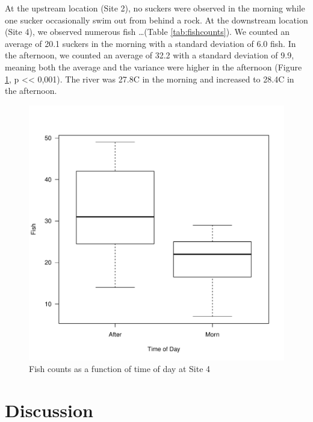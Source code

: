 \documentclass{article}\usepackage[]{graphicx}\usepackage[]{color}
\makeatletter
\def\maxwidth{ %
  \ifdim\Gin@nat@width>\linewidth
    \linewidth
  \else
    \Gin@nat@width
  \fi
}
\newenvironment{knitrout}{}{} %
\makeatother
\begin{document}
At the upstream location (Site 2), no suckers were observed in the morning while one sucker occasionally swim out from behind a rock. At the downstream location (Site 4), we observed numerous fish \ldots (Table \ref{tab:fishcounts}). We counted an average of 20.1 suckers in the morning with a standard deviation of 6.0 fish.  In the afternoon, we counted an average of 32.2 with a standard deviation of 9.9, meaning both the average and the variance were higher in the afternoon (Figure \ref{fig:fishsection}, p << 0,001).  The river was 27.8\textdegree C in the morning and increased to 28.4\textdegree C in the afternoon. 

\begin{figure}[!ht]
\begin{knitrout}
\color{fgcolor}
\includegraphics[width=\maxwidth]{figure/unnamed-chunk-7-1} 

\end{knitrout}
\caption{Fish counts as a function of time of day at Site 4}
\label{fig:fishsection}
\end{figure}

\section{Discussion}
\end{document}
